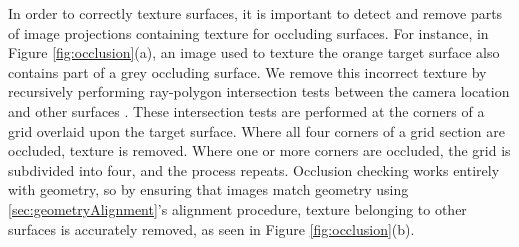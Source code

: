 \documentclass[]{spie}  %
\begin{document}
In order to correctly texture surfaces, it is important to detect and
remove parts of image projections containing texture for occluding
surfaces. For instance, in Figure \ref{fig:occlusion}(a), an image
used to texture the orange target surface also contains part of a grey
occluding surface. We remove this incorrect texture by recursively
performing ray-polygon intersection tests between the camera location
and other surfaces \cite{rayintersection}. These intersection tests
are performed at the corners of a grid overlaid upon the target
surface. Where all four corners of a grid section are occluded,
texture is removed. Where one or more corners are occluded, the grid
is subdivided into four, and the process repeats. Occlusion checking
works entirely with geometry, so by ensuring that images match
geometry using \ref{sec:geometryAlignment}'s alignment procedure,
texture belonging to other surfaces is accurately removed, as seen in
Figure \ref{fig:occlusion}(b).

\end{document}
